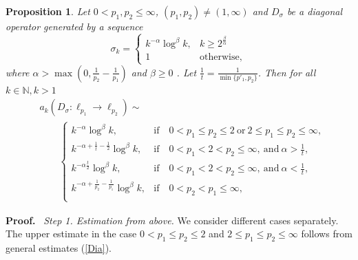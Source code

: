 \documentclass[12pt]{article}
\newtheorem{Prop}{Proposition}
\newcommand{\bp}{\begin{Prop}}
\newcommand{\ep}{\end{Prop}}
\newcommand{\bpr}{{\bf Proof.}\ }
\newcommand{\N}{{\mathbb N}}
\begin{document}
\bp \label{mainDia}
Let $0< p_1,p_2\leq\infty$, $(p_1,p_2)\neq (1,\infty)$ and $D_\sigma$ be a diagonal operator generated by a sequence 
\[
\sigma_k=\left\{ \begin{array}{ll} k^{-\alpha}\log^\beta k, & k\ge 2^{\frac{\beta}{\alpha}}\\	%
	1  &{\mathrm{otherwise},} \end{array}\right. 
\]
where $\alpha>\max(0,\frac{1}{p_2}-\frac{1}{p_1})$ and $\beta \geq 0$ . Let $\frac{1}{t}=\frac{1}{\min\{p'_1,p_2\}}$. Then  for all $k\in\N, k>1$ 
\begin{align*}
&a_k(D_\sigma :\ell_{p_1}\rightarrow \ell_{p_2})\sim \\
&\qquad \left\{ \begin{array}{ll}
	 k^{-\alpha}\log^\beta k, &{\mathrm{if}\quad 0< p_1\leq p_2\leq2\ \mathrm{or}\ 2\leq p_1\leq p_2\leq\infty,}\\  k^{-\alpha+\frac{1}{t}-\frac{1}{2}}\log^\beta k, &{\mathrm{if}\quad 0< p_1<2< p_2 \leq\infty, %
	 	 \ \mathrm{and}\ \alpha>\frac{1}{t},}\\
	k^{-\alpha\frac{t}{2}}\log^\beta k, &{\mathrm{if}\quad 0< p_1< 2< p_2 \leq\infty, %
		 \ \mathrm{and}\ \alpha<\frac{1}{t},}
	\\ k^{-\alpha+\frac{1}{p_2}-\frac{1}{p_1}}\log^\beta k, &{\mathrm{if}\quad 0< p_2< p_1 \leq\infty,} \\
\end{array}\right.
\end{align*}
\ep

\bpr
{\em Step 1. Estimation from above.} We consider different cases separately. 
The upper estimate in the case $0<p_1\leq p_2\leq2$ and $2\leq p_1\leq p_2\leq\infty$ follows from general estimates (\ref{Dia}). 
 
\end{document}
